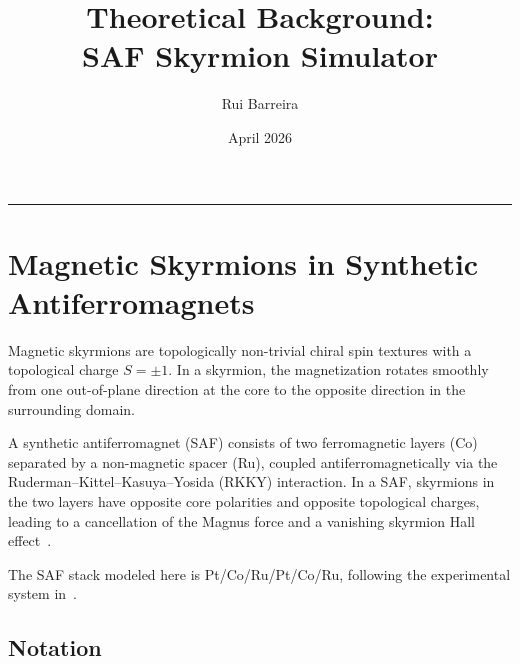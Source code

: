 \documentclass[11pt,a4paper]{article}
\title{Theoretical Background:\\
SAF Skyrmion Simulator}
\author{Rui Barreira}
\date{April 2026}
\begin{document}
\maketitle

\tableofcontents
\bigskip\hrule\bigskip

\section{Magnetic Skyrmions in Synthetic Antiferromagnets}

Magnetic skyrmions are topologically non-trivial chiral spin textures
with a topological charge $S = \pm 1$. In a skyrmion, the
magnetization rotates smoothly from one out-of-plane direction at the
core to the opposite direction in the surrounding domain.

A synthetic antiferromagnet (SAF) consists of two ferromagnetic layers
(Co) separated by a non-magnetic spacer (Ru), coupled
antiferromagnetically via the Ruderman--Kittel--Kasuya--Yosida (RKKY)
interaction. In a SAF, skyrmions in the two layers have opposite core
polarities and opposite topological charges, leading to a cancellation
of the Magnus force and a vanishing skyrmion Hall
effect~\cite{pham2024}.

The SAF stack modeled here is Pt/Co/Ru/Pt/Co/Ru, following the
experimental system in~\cite{pham2024}.

\subsection{Notation}
\label{sec:notation}
\end{document}
